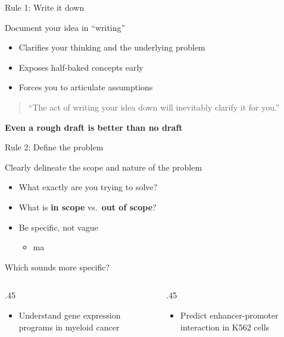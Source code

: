 \documentclass[
  12pt,
  ignorenonframetext,
  aspectratio=169]{beamer}
\providecommand{\tightlist}{%
  \setlength{\itemsep}{0pt}\setlength{\parskip}{0pt}}
\begin{document}
\begin{frame}{Rule 1: Write it down}
\protect{}\label{rule-1-write-it-down}
\Large

Document your idea in ``writing''

\normalsize

\vfill

\begin{itemize}
\item
  Clarifies your thinking and the underlying problem
\item
  Exposes half-baked concepts early
\item
  Forces you to articulate assumptions
\end{itemize}

\begin{quote}
``The act of writing your idea down will inevitably clarify it for
you.''
\end{quote}

\vfill

\textbf{Even a rough draft is better than no draft}
\end{frame}

\begin{frame}{Rule 2: Define the problem}
\protect{}\label{rule-2-define-the-problem}
\Large

Clearly delineate the scope and nature of the problem

\normalsize

\vfill

\begin{itemize}
\item
  What exactly are you trying to solve?
\item
  What is \textbf{in scope} vs.~\textbf{out of scope}?
\item
  Be specific, not vague

  \begin{itemize}
  \tightlist
  \item
    ma\vfill
  \end{itemize}
\end{itemize}

Which sounds more specific?

\begin{columns}[T]
\begin{column}{.45\linewidth}
\begin{itemize}
\tightlist
\item
  Understand gene expression programs in myeloid cancer
\end{itemize}
\end{column}

\begin{column}{.45\linewidth}
\begin{itemize}
\tightlist
\item
  Predict enhancer-promoter interaction in K562 cells
\end{itemize}
\end{column}
\end{columns}
\end{frame}
\end{document}
